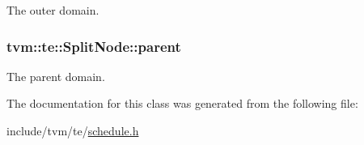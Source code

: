 The outer domain. 

\subsubsection[{\texorpdfstring{parent}{parent}}]{ tvm\+::te\+::\+Split\+Node\+::parent}\hypertarget{classtvm_1_1te_1_1SplitNode_aff313d36c09c8d93ba34aa4a251d6a9f}{}\label{classtvm_1_1te_1_1SplitNode_aff313d36c09c8d93ba34aa4a251d6a9f}


The parent domain. 



The documentation for this class was generated from the following file\+:\begin{DoxyCompactItemize}
\item 
include/tvm/te/\hyperlink{schedule_8h}{schedule.\+h}\end{DoxyCompactItemize}
